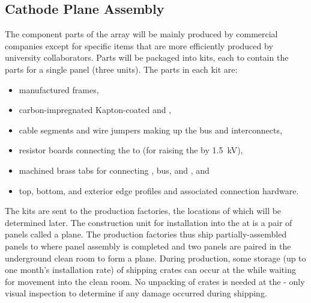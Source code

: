 \subsection{Cathode Plane Assembly}
\label{sec:fdsp-hv-prod-cpa}
 The component parts of the  array will be mainly produced by commercial companies except for specific items that are more efficiently produced by university collaborators.  Parts will be packaged into kits, each to contain the parts for a single  panel
(three  units). The parts in each kit are: 
\begin{itemize}
\item manufactured \frfour {} frames, %
\item carbon-impregnated Kapton-coated  and ,
\item {} cable segments and wire jumpers making up the   bus and  interconnects,
\item resistor boards connecting the  to  (for raising the   by \SI{1.5}{\kV}),
\item machined brass tabs for connecting ,  bus, and , and
\item top, bottom, and exterior edge profiles and associated connection hardware.
\end{itemize}
The kits are sent to the production factories, the locations of which will be determined later.  
The %
 construction unit for installation into the  at \surf is a pair of  panels called a  plane. The production factories thus ship partially-assembled  panels to \surf where panel assembly is completed and two panels are paired in the underground clean room to form a  plane. During production, some storage (up to one month's installation rate) of  shipping crates can occur at the  while waiting for movement into the \surf clean room.  No unpacking of crates is needed at the  - only visual inspection to determine if any damage occurred during shipping.

